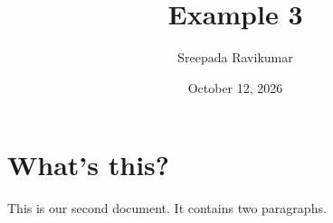 \documentclass[a4paper,12pt]{article}
\begin{document}
\title{Example 3}
\author{Sreepada Ravikumar}
\date{October 12, 2026}
\maketitle
\section{What's this?}
This is our second document.
It contains two paragraphs. 

\end{document}
